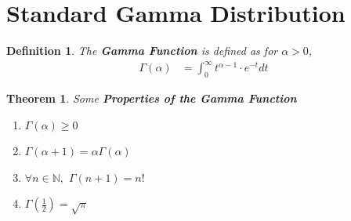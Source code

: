 \documentclass[11pt,oneside]{book}
\theoremstyle{break}
\theoremstyle{break}
\newtheorem{thm}{Theorem}[section]
\newtheorem{defn}{Definition}[corL]
\newcommand{\N}{\mathbb{N}}
\begin{document}
\section[Gamma Distribution]{\color{DarkOrchid} Standard Gamma Distribution\color{black}}
\begin{defn}
The \textbf{Gamma Function} is defined as  for $\alpha >0$,\begin{align*}
\Gamma(\alpha)&=\int_{0}^{\infty}t^{\alpha -1}\cdot e^{-t}dt
\end{align*}
\end{defn}
\begin{thm}
Some \textbf{Properties of the Gamma Function}
\begin{enumerate}
\item $\Gamma (\alpha)\geq 0$
\item $\Gamma (\alpha +1)=\alpha \Gamma(\alpha)$
\item $\forall n \in \N,$ $\Gamma(n+1)=n!$ 
\item $\Gamma\left(\frac{1}{2} \right)=\sqrt{\pi}$
\end{enumerate}
\end{thm}
\end{document}

